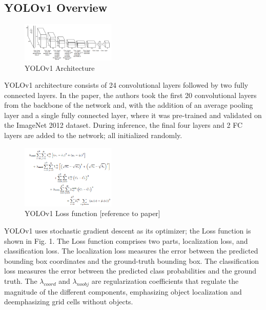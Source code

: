 \documentclass[10pt,twocolumn,letterpaper]{article}
\begin{document}
\subsection{YOLOv1 Overview}

\begin{figure}[h]
    \centering
    \includegraphics[width=0.4\textwidth]{figures/YOLOv1 Architecture.png}
    \caption{YOLOv1 Architecture}
    \label{fig:my_label}
\end{figure}


YOLOv1 architecture consists of 24 convolutional layers followed by two fully connected layers. In the paper, the authors took the first 20 convolutional layers from the backbone of the network and, with the addition of an average pooling layer and a single fully connected layer, where it was pre-trained and validated on the ImageNet 2012 dataset. During inference, the final four layers and 2 FC layers are added to the network; all initialized randomly.


\begin{figure}[h]
    \centering
    \includegraphics[width=0.4\textwidth]{figures/YOLO_Loss.png}
    \caption{YOLOv1 Loss function [reference to paper]}
    \label{fig:YOLO_Loss}
\end{figure}

YOLOv1 uses stochastic gradient descent as its optimizer; the Loss function is shown in Fig. 1. The Loss function comprises two parts, localization loss, and classification loss. The localization loss measures the error between the predicted bounding box coordinates and the ground-truth bounding box. The classification loss measures the error between the predicted class probabilities and the ground truth. The $\lambda_{coord}$ and $\lambda_{noobj}$ are regularization coefficients that regulate the magnitude of the different components, emphasizing object localization and deemphasizing grid cells without objects.  
\end{document}
